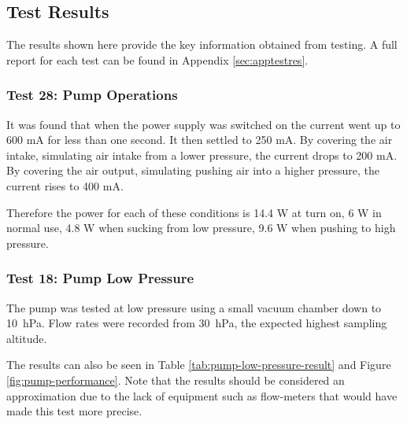 \pagebreak

\subsection{Test Results}
The results shown here provide the key information obtained from testing. A full report for each test can be found in Appendix \ref{sec:apptestres}.

\subsubsection{Test 28: Pump Operations}
\label{sec:test28result}

It was found that when the power supply was switched on the current went up to 600 mA for less than one second. It then settled to 250 mA. By covering the air intake, simulating air intake from a lower pressure, the current drops to 200 mA. By covering the air output, simulating pushing air into a higher pressure, the current rises to 400 mA.

Therefore the power for each of these conditions is 14.4 W at turn on, 6 W in normal use, 4.8 W when sucking from low pressure, 9.6 W when pushing to high pressure.

\subsubsection{Test 18: Pump Low Pressure}\label{subsection:pumplowpressuretest}

The pump was tested at low pressure using a small vacuum chamber down to \SI{10}{\hecto\pascal}. Flow rates were recorded from \SI{30}{\hecto\pascal}, the expected highest sampling altitude.

 The results can also be seen in Table \ref{tab:pump-low-pressure-result} and Figure \ref{fig:pump-performance}. Note that the results should be considered an approximation due to the lack of equipment such as flow-meters that would have made this test more precise. 



